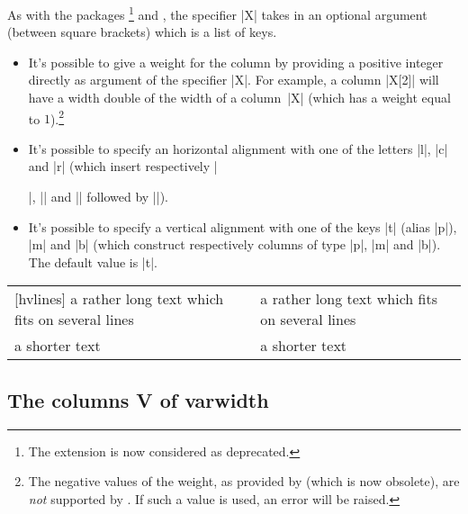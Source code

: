 \documentclass[dvipsnames]{article}%
\begin{document}
As with the packages \footnote{The extension  is now
considered as deprecated.} and , the specifier |X| takes
in an optional argument (between square brackets) which is a list of keys.
\begin{itemize}
\item It's possible to give a weight for the column by providing a positive
integer directly as argument of the specifier |X|. For example, a column
|X[2]| will have a width double of the width of a column~|X| (which has a
weight equal to $1$).\footnote{The negative values of the weight, as provided
by  (which is now obsolete), are \emph{not} supported by .
If such a value is used, an error will be raised.}
\item It's possible to specify an horizontal alignment with one of the
letters |l|, |c| and |r| (which insert respectively |\raggedright|,
|\centering| and |\raggedleft| followed by |\arraybackslash|).
\item It's possible to specify a vertical alignment with one of the keys
|t| (alias |p|), |m| and |b| (which construct respectively columns of type
|p|, |m| and |b|). The default value is |t|.
\end{itemize}


\begin{center}
\begin{NiceTabular}[width=9cm]{X[2,l]X[l]}[hvlines]
a rather long text which fits on several lines 
& a rather long text which fits on several lines \\
a shorter text & a shorter text
\end{NiceTabular}
\end{center}


\subsection{The columns V of varwidth}

\label{varwidth}
\end{document}
